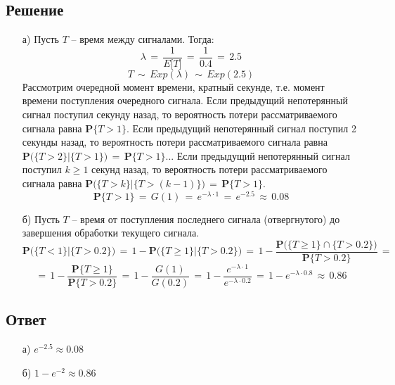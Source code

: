 \documentclass{article}
\begin{document}
\subsection*{Решение}
\begin{enumerate}
\item[а)] Пусть $ T $ -- время между сигналами. Тогда:
\[ \lambda \, = \, \dfrac{1}{E \big[ T \big]} \, = \, \dfrac{1}{0.4} \, = \, 2.5 \]
\[ T \, \sim \, Exp \left( \lambda \right) \, \sim \, Exp(2.5) \]
Рассмотрим очередной момент времени, кратный секунде, т.е. момент времени поступления очередного сигнала. Если предыдущий непотерянный сигнал поступил секунду назад, то вероятность потери рассматриваемого сигнала равна $ \mathbf{P} \big\{ T \! > \! 1 \big\} $. Если предыдущий непотерянный сигнал поступил 2 секунды назад, то вероятность потери рассматриваемого сигнала равна $ \mathbf{P} \bigg( \big\{ T \! > \! 2 \big\} \big| \big\{ T \! > \! 1 \big\} \bigg) \, = \, \mathbf{P} \big\{ T \! > \! 1 \big\} $... Если предыдущий непотерянный сигнал поступил $ k \! \geqslant \! 1 $ секунд назад, то вероятность потери рассматриваемого сигнала равна $ \mathbf{P} \bigg( \big\{ T \! > \! k \big\} \big| \big\{ T \! > \! (k \! - \! 1) \big\} \bigg) \, = \, \mathbf{P} \big\{ T \! > \! 1 \big\} $.
\[ \mathbf{P} \big\{ T \! > \! 1 \big\} \, = \, G(1) \, = \, e^{-\lambda \cdot 1} \, = \, e^{-2.5} \, \approx \, 0.08 \]
\item[б)] Пусть $ T $ -- время от поступления последнего сигнала (отвергнутого) до завершения обработки текущего сигнала.
\[ \mathbf{P} \bigg( \big\{ T \! < 1 \big\} \big| \big\{ T \! > \! 0.2 \big\} \bigg) \, = \, 1 \! - \! \mathbf{P} \bigg( \big\{ T \! \geqslant 1 \big\} \big| \big\{ T \! > \! 0.2 \big\} \bigg) \, = \, 1 \! - \! \dfrac{\mathbf{P} \bigg( \big\{ T \! \geqslant 1 \big\} \cap \big\{ T \! > \! 0.2 \big\} \bigg)}{\mathbf{P} \big\{ T \! > \! 0.2 \big\}} \, = \]
\[ = \, 1 \! - \! \dfrac{\mathbf{P} \big\{ T \! \geqslant \! 1 \big\}}{\mathbf{P} \big\{ T \! > \! 0.2 \big\}} \, = \, 1 \! - \! \dfrac{G(1)}{G(0.2)} \, = \, 1 \! - \! \dfrac{e^{-\lambda \cdot 1}}{e^{-\lambda \cdot 0.2}} \, = \, 1 \! - \! e^{-\lambda \cdot 0.8} \, \approx \, 0.86 \]
\end{enumerate}
\subsection*{Ответ}
\begin{enumerate}
\item[а)] $ e^{-2.5} \! \approx \! 0.08 $
\item[б)] $ 1 \! - \! e^{-2} \! \approx \! 0.86 $
\end{enumerate}
\end{document}
